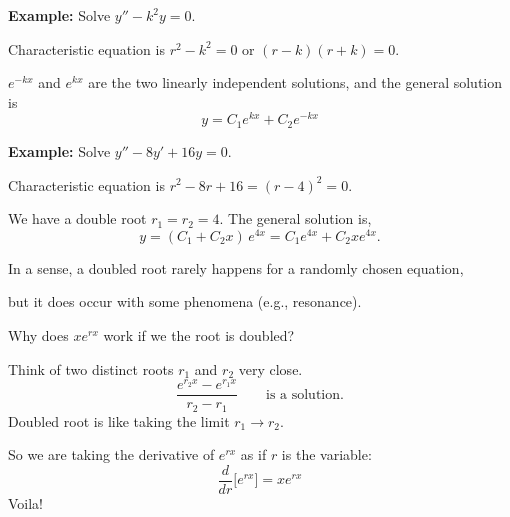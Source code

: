 \documentclass[10pt,aspectratio=169]{beamer}
\begin{document}
\begin{frame}

\textbf{Example:}
Solve
\quad $y'' - k^2 y = 0$.

\medskip
\pause

Characteristic equation is $r^2 - k^2 = 0$ or $(r-k)(r+k) = 0$.

\medskip
\pause

\wthus $e^{-k x}$ and $e^{kx}$ are the two
linearly independent solutions,
\pause
and the general solution is
\[
y = C_1 e^{kx} + C_2e^{-kx}
\]

\medskip
\pause

\textbf{Example:}
Solve \quad
$y'' -8 y' + 16 y = 0$.

\medskip
\pause

Characteristic equation is $r^2 - 8 r + 16 = {(r-4)}^2 = 0$.

\medskip
\pause

We have
a double root $r_1 = r_2 = 4$.
\medskip
The general solution is,
\[
y = (C_1 + C_2 x)\, e^{4 x} = C_1 e^{4x} + C_2 x e^{4x} .
\]
\end{frame}

\begin{frame}
In a sense, a doubled root rarely happens for a randomly chosen equation,

but it does occur with some phenomena (e.g., resonance).

\medskip
\pause

Why does $xe^{rx}$ work if we the root is doubled?

\medskip
\pause

Think of two distinct roots $r_1$ and $r_2$ very close.
\pause
\[
\frac{e^{r_2 x} - e^{r_1 x}}{r_2 - r_1}
\qquad \text{is a solution.}
\]
\pause
Doubled root is like taking the limit
$r_1 \to r_2$.

\medskip
\pause

So we are taking the derivative of $e^{rx}$ as if $r$ is the variable:
\[
\frac{d}{dr} \bigl[ e^{rx} \bigr] = x e^{rx}
\]
\pause
Voila!

\end{frame}
\end{document}
